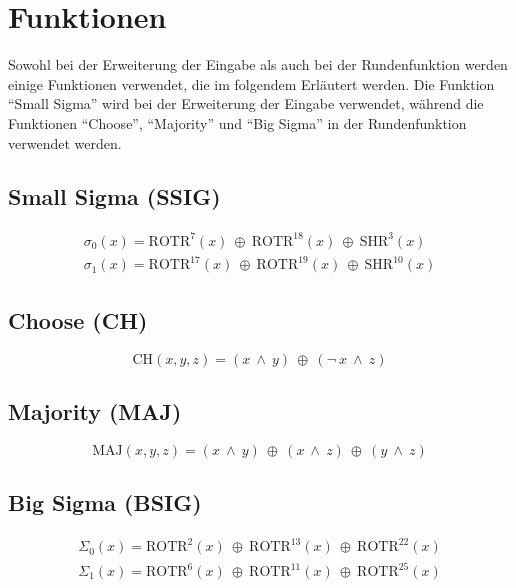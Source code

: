 \section{Funktionen}
\label{sec:sha256:funktionen}

Sowohl bei der Erweiterung der Eingabe als auch bei der Rundenfunktion werden einige Funktionen verwendet, die im folgendem Erläutert werden.
Die Funktion "`Small Sigma"' wird bei der Erweiterung der Eingabe verwendet, während die Funktionen "`Choose"', "`Majority"' und "`Big Sigma"' in der Rundenfunktion
verwendet werden.

\subsection{Small Sigma (SSIG)}
\begin{eqnarray}
\sigma_0(x) = \text{ROTR}^{7}(x)~\oplus~\text{ROTR}^{18}(x)~\oplus~\text{SHR}^{3}(x)\\
\sigma_1(x) = \text{ROTR}^{17}(x)~\oplus~\text{ROTR}^{19}(x)~\oplus~\text{SHR}^{10}(x)
\end{eqnarray}

\subsection{Choose (CH)}
\begin{equation}
\text{CH}( x, y, z) = (x~\wedge~y)~\oplus~( \neg~x~\wedge~z)
\end{equation}

\subsection{Majority (MAJ)}
\begin{equation}
\text{MAJ}( x, y, z) = (x~\wedge~y)~\oplus~(x~\wedge~z)~\oplus~(y~\wedge~z)
\end{equation}

\subsection{Big Sigma (BSIG)}
\begin{eqnarray}
\Sigma_0(x) = \text{ROTR}^{2}(x)~\oplus~\text{ROTR}^{13}(x)~\oplus~\text{ROTR}^{22}(x)\\
\Sigma_1(x) = \text{ROTR}^{6}(x)~\oplus~\text{ROTR}^{11}(x)~\oplus~\text{ROTR}^{25}(x)
\end{eqnarray}